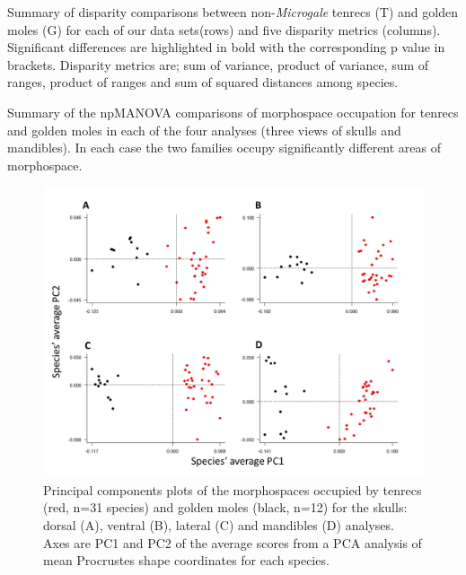 \documentclass[12pt,a4paper]{article}
\begin{document}
	\begin{table}[h]			
	\caption{Summary of disparity comparisons between non-\textit{Microgale} tenrecs (T) and golden moles (G) for each of our data sets(rows) and five disparity metrics (columns). Significant differences are highlighted in bold with the corresponding p value in brackets. Disparity metrics are; sum of variance, product of variance, sum of ranges, product of ranges and sum of squared distances among species. }
	\centering
	 
	\label{tab:disp.nonmic.summary}  
	\end{table}
	
	
	\begin{table}[h]			

	\caption{Summary of the npMANOVA comparisons of morphospace occupation for tenrecs and golden moles in each of the four analyses (three views of skulls and mandibles). In each case the two families occupy significantly different areas of morphospace.}
	\centering
	 
	\label{tab:npmanova.summary}  
	\end{table}
		
	\begin{figure}[H]
	\centering
	\includegraphics[width=1\linewidth]{figures/FourPlotPCA.png}
	\caption{Principal components plots of the morphospaces occupied by tenrecs (red, n=31 species) and golden moles (black, n=12) for the skulls: dorsal (A), ventral (B), lateral (C) and mandibles (D) analyses. Axes are PC1 and PC2 of the average scores from a PCA analysis of mean Procrustes shape coordinates for each species. }
	\label{fig:fourPCA}
	\end{figure}
\end{document}
